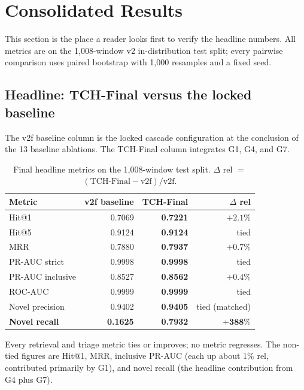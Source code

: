 \section{Consolidated Results}
\label{sec:results}

This section is the place a reader looks first to verify the headline numbers. All metrics are on the 1{,}008-window v2 in-distribution test split; every pairwise comparison uses paired bootstrap with 1{,}000 resamples and a fixed seed.

\subsection{Headline: TCH-Final versus the locked baseline}

The v2f baseline column is the locked cascade configuration at the conclusion of the 13 baseline ablations. The TCH-Final column integrates G1, G4, and G7.

\begin{table}[h]
\centering
\caption{Final headline metrics on the 1{,}008-window test split. $\Delta$ rel $=$ $(\text{TCH-Final} - \text{v2f}) / \text{v2f}$.}
\label{tab:headline}
\small
\begin{tabular}{lrrr}
\toprule
Metric & v2f baseline & \textbf{TCH-Final} & $\Delta$ rel \\
\midrule
Hit@1                & 0.7069 & \textbf{0.7221} & $+2.1\%$ \\
Hit@5                & 0.9124 & \textbf{0.9124} & tied \\
MRR                  & 0.7880 & \textbf{0.7937} & $+0.7\%$ \\
PR-AUC strict        & 0.9998 & \textbf{0.9998} & tied \\
PR-AUC inclusive     & 0.8527 & \textbf{0.8562} & $+0.4\%$ \\
ROC-AUC              & 0.9999 & \textbf{0.9999} & tied \\
Novel precision      & 0.9402 & \textbf{0.9405} & tied (matched) \\
\textbf{Novel recall} & \textbf{0.1625} & \textbf{0.7932} & $\boldsymbol{+388\%}$ \\
\bottomrule
\end{tabular}
\end{table}

Every retrieval and triage metric ties or improves; no metric regresses. The non-tied figures are Hit@1, MRR, inclusive PR-AUC (each up about $1\%$ rel, contributed primarily by G1), and novel recall (the headline contribution from G4 plus G7).

